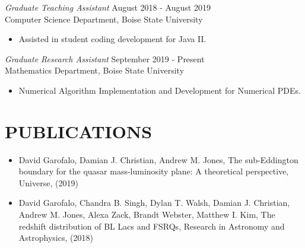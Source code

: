 \documentclass[margin, 10pt]{res} %
\begin{document}
\begin{resume}
{\sl Graduate Teaching Assistant} \hfill August 2018 - August 2019 \\
Computer Science Department, Boise State University
\begin{itemize} 
\item Assisted in student coding development for Java II.
\end{itemize} 

{\sl Graduate Research Assistant} \hfill September 2019 - Present \\
Mathematics Department, Boise State University 
\begin{itemize}
\item Numerical Algorithm Implementation and Development for Numerical PDEs.
\end{itemize} 



\section{PUBLICATIONS}

\begin{itemize}
\item David Garofalo, Damian J. Christian, Andrew M. Jones, The sub-Eddington boundary for the quasar mass-luminosity plane: A theoretical perspective, Universe, (2019)
\item David Garofalo, Chandra B. Singh, Dylan T. Walsh, Damian J. Christian, Andrew M. Jones, Alexa Zack, Brandt Webster, Matthew I. Kim, The redshift distribution of BL Lacs and FSRQs, Research in Astronomy and Astrophysics, (2018) 
\end{itemize}

\end{resume}
\end{document}
